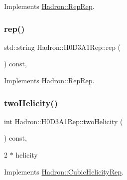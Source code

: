 Implements \mbox{\hyperlink{structHadron_1_1RepRep_ab3213025f6de249f7095892109575fde}{Hadron\+::\+Rep\+Rep}}.

\mbox{\label{structHadron_1_1H0D3A1Rep_a5dae40cb41876bf42a5c9f65ffd5f222}} 
\subsubsection{\texorpdfstring{rep()}{rep()}\hspace{0.1cm}{\footnotesize\ttfamily [5/5]}}
{\footnotesize\ttfamily std\+::string Hadron\+::\+H0\+D3\+A1\+Rep\+::rep (\begin{DoxyParamCaption}{ }\end{DoxyParamCaption}) const\hspace{0.3cm}{\ttfamily [inline]}, {\ttfamily [virtual]}}



Implements \mbox{\hyperlink{structHadron_1_1RepRep_ab3213025f6de249f7095892109575fde}{Hadron\+::\+Rep\+Rep}}.

\mbox{\label{structHadron_1_1H0D3A1Rep_a2a2524dad4c9988ef8a9ffb9a5ffa576}} 
\subsubsection{\texorpdfstring{twoHelicity()}{twoHelicity()}\hspace{0.1cm}{\footnotesize\ttfamily [1/3]}}
{\footnotesize\ttfamily int Hadron\+::\+H0\+D3\+A1\+Rep\+::two\+Helicity (\begin{DoxyParamCaption}{ }\end{DoxyParamCaption}) const\hspace{0.3cm}{\ttfamily [inline]}, {\ttfamily [virtual]}}

2 $\ast$ helicity 

Implements \mbox{\hyperlink{structHadron_1_1CubicHelicityRep_af507aa56fc2747eacc8cb6c96db31ecc}{Hadron\+::\+Cubic\+Helicity\+Rep}}.

\mbox{\label{structHadron_1_1H0D3A1Rep_a2a2524dad4c9988ef8a9ffb9a5ffa576}} 
